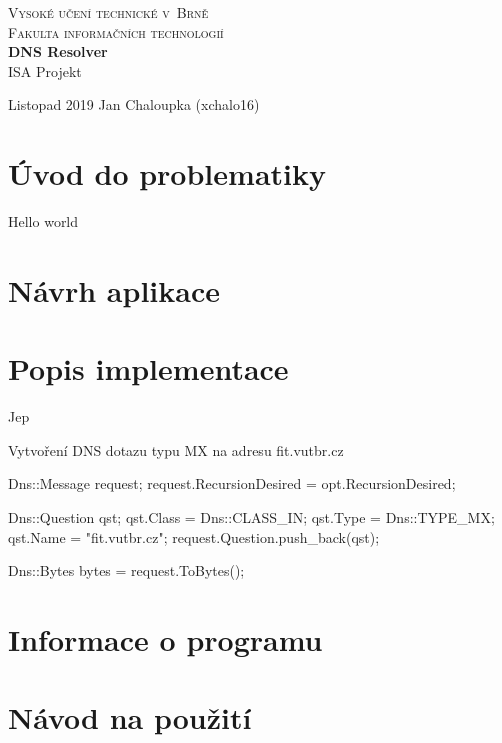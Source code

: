 \documentclass[a4paper,12pt]{article}
\begin{document}
\begin{titlepage}
	\begin{center}
		{
			\LARGE\textsc{Vysoké učení technické v~Brně}\\
			\Large\textsc{Fakulta informačních technologií}\\
		}
		{
			\textbf{\Huge DNS Resolver}\\
			\vspace{3mm}
			\LARGE ISA Projekt\\
		}
	\end{center}
	{\large Listopad 2019 \hfill Jan Chaloupka (xchalo16)}
\end{titlepage}
\tableofcontents
\newpage

\section{Úvod do problematiky}
Hello world 
\section{Návrh aplikace}

\section{Popis implementace}
Jep
\begin{listing}
\caption{Vytvoření DNS dotazu typu MX na adresu fit.vutbr.cz}
\begin{cppcode}
Dns::Message request;
request.RecursionDesired = opt.RecursionDesired;

Dns::Question qst;
qst.Class = Dns::CLASS_IN;
qst.Type = Dns::TYPE_MX;
qst.Name = "fit.vutbr.cz";
request.Question.push_back(qst);

Dns::Bytes bytes = request.ToBytes();
\end{cppcode}
\end{listing}
\section{Informace o programu}

\section{Návod na použití}
\end{document}
